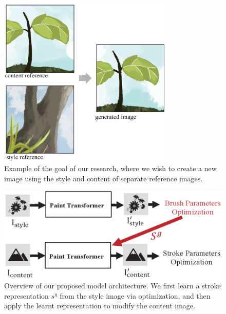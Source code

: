 \documentclass{mva_style}
\begin{document}
\begin{figure}[ht!]
  \centering
  \includegraphics[width=83mm]{resource/haru.eps}
  \caption{Example of the goal of our research, where we wish to create a new image using the style and content of separate reference images.}
  \label{fig:haru}
\end{figure}

\begin{figure}[t]
  \centering
  \includegraphics[width=166mm]{resource/target_model.eps}
  \caption{Overview of our proposed model architecture. We first learn a stroke representation $s^g$ from the style image via optimization, and then apply the learnt representation to modify the content image.}
  \label{fig:final_model}
\end{figure}
\end{document}
